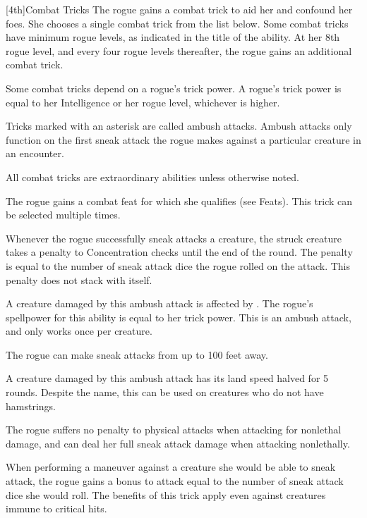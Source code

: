 [4th]{Combat Tricks}
The rogue gains a combat trick to aid her and confound her foes.
She chooses a single combat trick from the list below.
Some combat tricks have minimum rogue levels, as indicated in the title of the ability.
At her 8th rogue level, and every four rogue levels thereafter, the rogue gains an additional combat trick.

Some combat tricks depend on a rogue's trick power.
A rogue's trick power is equal to her Intelligence or her rogue level, whichever is higher.

Tricks marked with an asterisk are called ambush attacks.
Ambush attacks only function on the first sneak attack the rogue makes against a particular creature in an encounter.

All combat tricks are extraordinary abilities unless otherwise noted.

    The rogue gains a combat feat for which she qualifies (see Feats).
    This trick can be selected multiple times.

    Whenever the rogue successfully sneak attacks a creature, the struck creature takes a penalty to Concentration checks until the end of the round.
    The penalty is equal to the number of sneak attack dice the rogue rolled on the attack.
    This penalty does not stack with itself.

    A creature damaged by this ambush attack is affected by .
    The rogue's spellpower for this ability is equal to her trick power.
    This is an ambush attack, and only works once per creature.

    The rogue can make sneak attacks from up to 100 feet away.

    A creature damaged by this ambush attack has its land speed halved for 5 rounds.
    Despite the name, this can be used on creatures who do not have hamstrings.

    The rogue suffers no penalty to physical attacks when attacking for nonlethal damage, and can deal her full sneak attack damage when attacking nonlethally.


    When performing a maneuver against a creature she would be able to sneak attack, the rogue gains a bonus to attack equal to the number of sneak attack dice she would roll.
    The benefits of this trick apply even against creatures immune to critical hits.

